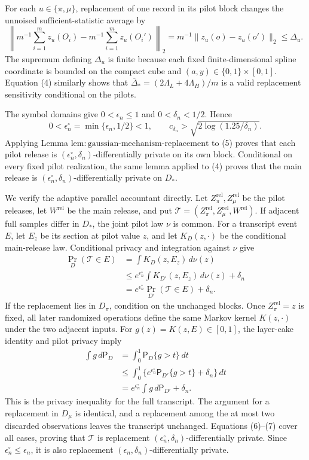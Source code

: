For each \(u\in\{\pi,\mu\}\), replacement of one record in its pilot block changes the unnoised sufficient-statistic average by
\[
 \left\|m^{-1}\sum_{i=1}^m z_u(O_i)
       -m^{-1}\sum_{i=1}^m z_u(O_i')\right\|_2
 =m^{-1}\|z_u(o)-z_u(o')\|_2\le\Delta_u.
\tag{5}
\]
The supremum defining \(\Delta_u\) is finite because each fixed finite-dimensional spline coordinate is bounded on the compact cube and \((a,y)\in\{0,1\}\times[0,1]\).  Equation (4) similarly shows that \(\overline\Delta_*=(2\Lambda_L+4\Lambda_H)/m\) is a valid replacement sensitivity conditional on the pilots.

The symbol domains give \(0<\epsilon_n\le1\) and \(0<\delta_n<1/2\).  Hence
\[
 0<\epsilon_n^\circ=\min\{\epsilon_n,1/2\}<1,
 \qquad
 c_{\delta_n}>\sqrt{2\log(1.25/\delta_n)}.
\]
Applying Lemma \(\mathrm{lem{:}gaussian\text{-}mechanism\text{-}replacement}\) to (5) proves that each pilot release is \((\epsilon_n^\circ,\delta_n)\)-differentially private on its own block.  Conditional on every fixed pilot realization, the same lemma applied to (4) proves that the main release is \((\epsilon_n^\circ,\delta_n)\)-differentially private on \(D_*\).

We verify the adaptive parallel accountant directly.  Let \(Z_\pi^{\mathrm{rel}},Z_\mu^{\mathrm{rel}}\) be the pilot releases, let \(W^{\mathrm{rel}}\) be the main release, and put \(\mathcal T=(Z_\pi^{\mathrm{rel}},Z_\mu^{\mathrm{rel}},W^{\mathrm{rel}})\).  If adjacent full samples differ in \(D_*\), the joint pilot law \(\nu\) is common.  For a transcript event \(E\), let \(E_z\) be its section at pilot value \(z\), and let \(K_D(z,\cdot)\) be the conditional main-release law.  Conditional privacy and integration against \(\nu\) give
\[
 \begin{aligned}
 \Pr_D(\mathcal T\in E)
 &=\int K_D(z,E_z)\,d\nu(z)\\
 &\le e^{\epsilon_n^\circ}\int K_{D'}(z,E_z)\,d\nu(z)+\delta_n\\
 &=e^{\epsilon_n^\circ}\Pr_{D'}(\mathcal T\in E)+\delta_n.
 \end{aligned}
\tag{6}
\]
If the replacement lies in \(D_\pi\), condition on the unchanged blocks.  Once \(Z_\pi^{\mathrm{rel}}=z\) is fixed, all later randomized operations define the same Markov kernel \(K(z,\cdot)\) under the two adjacent inputs.  For \(g(z)=K(z,E)\in[0,1]\), the layer-cake identity and pilot privacy imply
\[
 \begin{aligned}
 \int g\,d\mathsf P_D
 &=\int_0^1\mathsf P_D\{g>t\}\,dt\\
 &\le\int_0^1\{e^{\epsilon_n^\circ}\mathsf P_{D'}\{g>t\}+\delta_n\}\,dt\\
 &=e^{\epsilon_n^\circ}\int g\,d\mathsf P_{D'}+\delta_n.
 \end{aligned}
\tag{7}
\]
This is the privacy inequality for the full transcript.  The argument for a replacement in \(D_\mu\) is identical, and a replacement among the at most two discarded observations leaves the transcript unchanged.  Equations (6)--(7) cover all cases, proving that \(\mathcal T\) is replacement \((\epsilon_n^\circ,\delta_n)\)-differentially private.  Since \(\epsilon_n^\circ\le\epsilon_n\), it is also replacement \((\epsilon_n,\delta_n)\)-differentially private.

